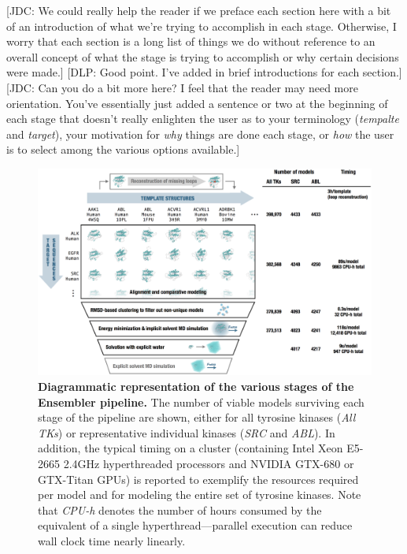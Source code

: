 \documentclass[aps,pre,twocolumn,nofootinbib,superscriptaddress,linenumbers]{revtex4-1}
\begin{document}
{\color{red}[JDC: We could really help the reader if we preface each section here with a bit of an introduction of what we're trying to accomplish in each stage.  Otherwise, I worry that each section is a long list of things we do without reference to an overall concept of what the stage is trying to accomplish or why certain decisions were made.]}
{\color{blue}[DLP: Good point. I've added in brief introductions for each section.]}
{\color{red}[JDC: Can you do a bit more here? I feel that the reader may need more orientation.  You've essentially just added a sentence or two at the beginning of each stage that doesn't really enlighten the user as to your terminology (\emph{tempalte} and \emph{target}), your motivation for \emph{why} things are done each stage, or \emph{how} the user is to select among the various options available.]}

\begin{figure}[tb]
    \includegraphics[width=1.0\textwidth]{pipeline/pipeline2}

  \caption{{\bf Diagrammatic representation of the various stages of the Ensembler pipeline.}
  The number of viable models surviving each stage of the pipeline are shown, either for all tyrosine kinases (\emph{All TKs}) or representative individual kinases (\emph{SRC} and \emph{ABL}).
  In addition, the typical timing on a cluster (containing Intel Xeon E5-2665 2.4GHz hyperthreaded processors and NVIDIA GTX-680 or GTX-Titan GPUs) is reported to exemplify the resources required per model and for modeling the entire set of tyrosine kinases.
  Note that \emph{CPU-h} denotes the number of hours consumed by the equivalent of a single hyperthread---parallel execution can reduce wall clock time nearly linearly.
  }
  \label{figpipeline}
\end{figure}
\end{document}
